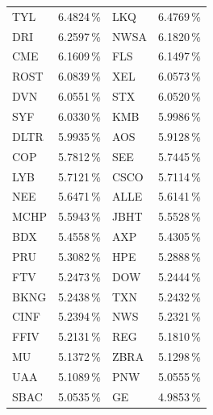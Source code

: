 \begin{longtable}{l c | l c}
    TYL    & 6.4824\,\%             & LKQ    & 6.4769\,\%                                    \\
    DRI    & 6.2597\,\%             & NWSA   & 6.1820\,\%                                    \\
    CME    & 6.1609\,\%             & FLS    & 6.1497\,\%                                    \\
    ROST   & 6.0839\,\%             & XEL    & 6.0573\,\%                                    \\
    DVN    & 6.0551\,\%             & STX    & 6.0520\,\%                                    \\
    SYF    & 6.0330\,\%             & KMB    & 5.9986\,\%                                    \\
    DLTR   & 5.9935\,\%             & AOS    & 5.9128\,\%                                    \\
    COP    & 5.7812\,\%             & SEE    & 5.7445\,\%                                    \\
    LYB    & 5.7121\,\%             & CSCO   & 5.7114\,\%                                    \\
    NEE    & 5.6471\,\%             & ALLE   & 5.6141\,\%                                    \\
    MCHP   & 5.5943\,\%             & JBHT   & 5.5528\,\%                                    \\
    BDX    & 5.4558\,\%             & AXP    & 5.4305\,\%                                    \\
    PRU    & 5.3082\,\%             & HPE    & 5.2888\,\%                                    \\
    FTV    & 5.2473\,\%             & DOW    & 5.2444\,\%                                    \\
    BKNG   & 5.2438\,\%             & TXN    & 5.2432\,\%                                    \\
    CINF   & 5.2394\,\%             & NWS    & 5.2321\,\%                                    \\
    FFIV   & 5.2131\,\%             & REG    & 5.1810\,\%                                    \\
    MU     & 5.1372\,\%             & ZBRA   & 5.1298\,\%                                    \\
    UAA    & 5.1089\,\%             & PNW    & 5.0555\,\%                                    \\
    SBAC   & 5.0535\,\%             & GE     & 4.9853\,\%                                    \\

\end{longtable}
